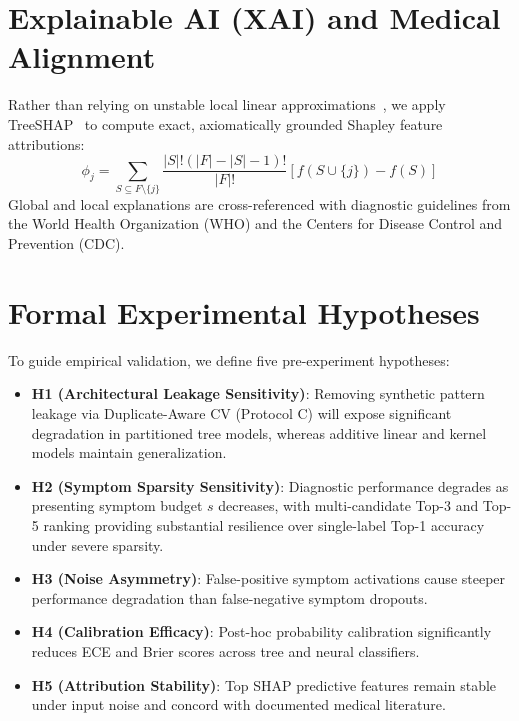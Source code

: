 \section{Explainable AI (XAI) and Medical Alignment}
\label{sec:xai_method}
Rather than relying on unstable local linear approximations~\cite{ribeiro2016why}, we apply TreeSHAP~\cite{lundberg2017unified} to compute exact, axiomatically grounded Shapley feature attributions:
\begin{equation}
    \phi_j = \sum_{S \subseteq F \setminus \{j\}} \frac{|S|!(|F| - |S| - 1)!}{|F|!} [f(S \cup \{j\}) - f(S)]
\end{equation}
Global and local explanations are cross-referenced with diagnostic guidelines from the World Health Organization (WHO) and the Centers for Disease Control and Prevention (CDC).

\section{Formal Experimental Hypotheses}
\label{sec:hypotheses}

To guide empirical validation, we define five pre-experiment hypotheses:
\begin{itemize}
    \item \textbf{H1 (Architectural Leakage Sensitivity)}: Removing synthetic pattern leakage via Duplicate-Aware CV (Protocol C) will expose significant degradation in partitioned tree models, whereas additive linear and kernel models maintain generalization.
    \item \textbf{H2 (Symptom Sparsity Sensitivity)}: Diagnostic performance degrades as presenting symptom budget $s$ decreases, with multi-candidate Top-3 and Top-5 ranking providing substantial resilience over single-label Top-1 accuracy under severe sparsity.
    \item \textbf{H3 (Noise Asymmetry)}: False-positive symptom activations cause steeper performance degradation than false-negative symptom dropouts.
    \item \textbf{H4 (Calibration Efficacy)}: Post-hoc probability calibration significantly reduces ECE and Brier scores across tree and neural classifiers.
    \item \textbf{H5 (Attribution Stability)}: Top SHAP predictive features remain stable under input noise and concord with documented medical literature.
\end{itemize}
